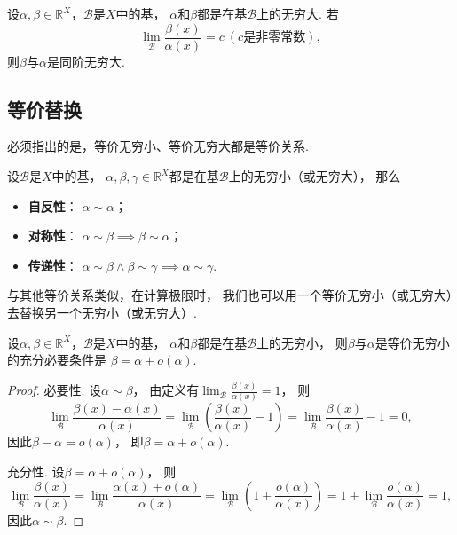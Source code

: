 \begin{proposition}
设\(\alpha,\beta\in\mathbb{R}^X\)，\(\mathcal{B}\)是\(X\)中的基，
\(\alpha\)和\(\beta\)都是在基\(\mathcal{B}\)上的无穷大.
若\[
	\lim_\mathcal{B} \frac{\beta(x)}{\alpha(x)} = c\ (\text{$c$是非零常数}),
\]
则\(\beta\)与\(\alpha\)是同阶无穷大.
\end{proposition}

\subsection{等价替换}
必须指出的是，等价无穷小、等价无穷大都是等价关系.
\begin{property}
设\(\mathcal{B}\)是\(X\)中的基，
\(\alpha,\beta,\gamma\in\mathbb{R}^X\)都是在基\(\mathcal{B}\)上的无穷小（或无穷大），
那么\begin{itemize}
	\item {\rm\bf 自反性}：
	\(\alpha \sim \alpha\)；

	\item {\rm\bf 对称性}：
	\(\alpha \sim \beta \implies \beta \sim \alpha\)；

	\item {\rm\bf 传递性}：
	\(\alpha \sim \beta \land \beta \sim \gamma \implies \alpha \sim \gamma\).
\end{itemize}
\end{property}

与其他等价关系类似，在计算极限时，
我们也可以用一个等价无穷小（或无穷大）去替换另一个无穷小（或无穷大）.

\begin{theorem}\label{theorem:极限.无穷小的比较1}
设\(\alpha,\beta\in\mathbb{R}^X\)，\(\mathcal{B}\)是\(X\)中的基，
\(\alpha\)和\(\beta\)都是在基\(\mathcal{B}\)上的无穷小，
则\(\beta\)与\(\alpha\)是等价无穷小的充分必要条件是
\(\beta = \alpha + o(\alpha)\).
\begin{proof}
必要性.
设\(\alpha\sim\beta\)，
由定义有\(\lim_\mathcal{B} \frac{\beta(x)}{\alpha(x)} = 1\)，
则\[
	\lim_\mathcal{B} \frac{\beta(x)-\alpha(x)}{\alpha(x)}
	= \lim_\mathcal{B} \left(\frac{\beta(x)}{\alpha(x)}-1\right)
	= \lim_\mathcal{B} \frac{\beta(x)}{\alpha(x)}-1 = 0,
\]
因此\(\beta-\alpha=o(\alpha)\)，
即\(\beta=\alpha+o(\alpha)\).

充分性.
设\(\beta=\alpha+o(\alpha)\)，
则\[
	\lim_\mathcal{B} \frac{\beta(x)}{\alpha(x)}
	= \lim_\mathcal{B} \frac{\alpha(x)+o(\alpha)}{\alpha(x)}
	= \lim_\mathcal{B} \left(1+\frac{o(\alpha)}{\alpha(x)}\right)
	= 1 + \lim_\mathcal{B} \frac{o(\alpha)}{\alpha(x)}
	= 1,
\]
因此\(\alpha\sim\beta\).
\end{proof}
\end{theorem}

